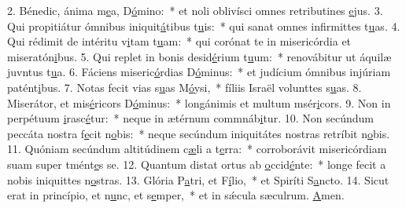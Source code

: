 2. Bénedic, ánima m\uline{e}a, D\uline{ó}mino:~* et noli oblivísci omnes retributines \uline{e}jus.
3. Qui propitiátur ómnibus iniquit\uline{á}tibus t\uline{u}is:~* qui sanat omnes infirmittes t\uline{u}as.
4. Qui rédimit de intéritu v\uline{i}tam t\uline{u}am:~* qui corónat te in misericórdia et miseratón\uline{i}bus.
5. Qui replet in bonis desid\uline{é}rium t\uline{u}um:~* renovábitur ut áquilæ juvntus t\uline{u}a.
6. Fáciens miseric\uline{ó}rdias D\uline{ó}minus:~* et judícium ómnibus injúriam patént\uline{i}bus.
7. Notas fecit vias s\uline{u}as M\uline{ó}ysi,~* fíliis Israël volunttes s\uline{u}as.
8. Miserátor, et mis\uline{é}ricors D\uline{ó}minus:~* longánimis et multum msér\uline{i}cors.
9. Non in perpétuum \uline{i}rasc\uline{é}tur:~* neque in ætérnum commnáb\uline{i}tur.
10. Non secúndum peccáta nostra f\uline{e}cit n\uline{o}bis:~* neque secúndum iniquitátes nostras retríbit n\uline{o}bis.
11. Quóniam secúndum altitúdinem c\uline{æ}li a t\uline{e}rra:~* corroborávit misericórdiam suam super tmént\uline{e}s se.
12. Quantum distat ortus ab \uline{o}ccid\uline{é}nte:~* longe fecit a nobis iniquittes n\uline{o}stras.
13. Glória P\uline{a}tri, et F\uline{í}lio,~* et Spiríti S\uline{a}ncto.
14. Sicut erat in princípio, et n\uline{u}nc, et s\uline{e}mper,~* et in sǽcula sæculrum. \uline{A}men.
